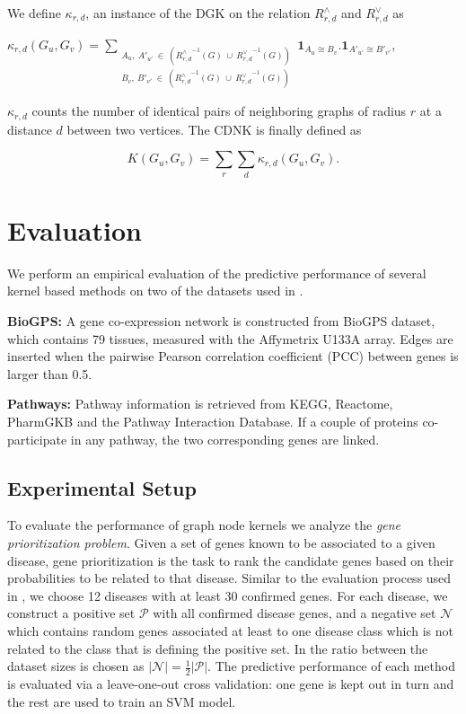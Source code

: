 \documentclass{esannV2}
\begin{document}
We define $\kappa_{r,d}$, an instance of the DGK on the relation $R^{\wedge}_{r,d}$ and $R^{\vee}_{r,d}$ as
\begin{center}
 $\kappa_{r,d}(G_u,G_v) = \!\!\!\!\!\!\!\!\!\!\!\! \sum\limits_{\substack
 {A_u,\ {A'}_{u'} \ \in \ ({R_{r,d}^{\wedge}}^{ -1}(G)\ \cup\  {R_{r,d}^{\vee}}^{ -1}(G)) \\
  B_v,\ {B'}_{v'} \ \in \ ({R_{r,d}^{\wedge}}^{ -1}(G)\ \cup\  {R_{r,d}^{\vee}}^{ -1}(G)) }} \!\!\!\!\!\!\!\!\!\!\!\!
  { \textbf{1}_{A_u \cong B_v}.{ \textbf{1}_{A'_{u'} \cong B'_{v'}}}}$,
\end{center}
$\kappa_{r,d}$ counts the number of identical pairs of neighboring graphs of radius $r$ at a distance $d$ between two vertices. The CDNK is finally defined as 

$$K(G_u,G_v) = \sum\limits_{r}{\sum\limits_{d}{\kappa_{r,d}(G_u,G_v)}}.$$

\section{Evaluation}
\label{evaluation}
We perform an empirical evaluation of the predictive performance of several kernel based methods on two of the datasets used in \cite{medk}.

\textbf{BioGPS:} A gene co-expression network is constructed from BioGPS dataset, which contains 79 tissues, measured with the Affymetrix U133A array. Edges are inserted when the pairwise Pearson correlation coefficient (PCC) between genes is larger than 0.5.

\textbf{Pathways:} Pathway information is retrieved from KEGG, Reactome, PharmGKB and the Pathway Interaction Database. If a couple of proteins co-participate in any pathway, the two corresponding genes are linked.  

\subsection{Experimental Setup}

To evaluate the performance of graph node kernels we analyze the {\em gene
prioritization problem}. Given a set of genes known to be associated to a
given disease, gene prioritization is the task to rank the candidate genes
based on their probabilities to be related to that disease. Similar to the
evaluation process used in \cite{medk}, we choose 12 diseases with at least 30
confirmed genes. For each disease, we construct a positive set $\mathcal{P}$
with all confirmed disease genes, and a negative set $\mathcal{N}$ which
contains random genes associated at least to one disease class which is not
related to the class that is defining the positive set. In \cite{medk} the
ratio between the dataset sizes is chosen as $\vert \mathcal{N} \vert =
\frac{1}{2} \vert \mathcal{P} \vert$. 
The predictive performance of each method is evaluated via a leave-one-out
cross validation: one gene is kept out in turn and the rest
are used to train an SVM model. 
\end{document}
